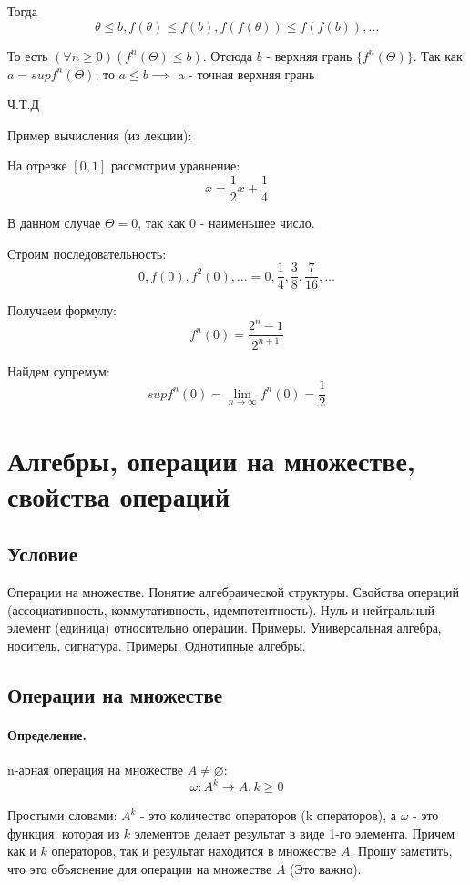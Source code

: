 \documentclass{report}
\begin{document}
\medskip

Тогда
\[
\theta \le b, f(\theta) \le  f(b), f(f(\theta)) \le  f(f(b)), \ldots
\] 


То есть $(\forall n \geq 0)(f^{n}(\Theta) \leq b)$. Отсюда $b$ - верхняя грань $\{f^{n}(\Theta)\}$.
Так как $a = supf^{n}(\Theta)$, то $a \leq b \implies$ a - точная верхняя грань

\medskip

Ч.Т.Д

\medskip

Пример вычисления (из лекции):

На отрезке $[0,1]$ рассмотрим уравнение: 
\[
x = \frac{1}{2}x + \frac{1}{4}
\]

В данном случае $\Theta = 0$, так как $0$ - наименьшее число.

Строим последовательность:
\[
0, f(0), f^{2}(0), \ldots = 0, \frac{1}{4}, \frac{3}{8}, \frac{7}{16}, \ldots
\] 

Получаем формулу:
\[
f^{n}(0) = \frac{2^{n} - 1}{2^{n+1}}
\] 

Найдем супремум:
\[
supf^{n}(0) = \lim_{n \to \infty} f^{n}(0) = \frac{1}{2}
\] 

\newpage

\section{Алгебры, операции на множестве, свойства операций}
\subsection{Условие}
Операции на множестве. Понятие алгебраической структуры. Свойства операций
(ассоциативность, коммутативность, идемпотентность). Нуль и нейтральный элемент
(единица) относительно операции. Примеры. Универсальная алгебра, носитель,
сигнатура. Примеры. Однотипные алгебры.

\subsection{Операции на множестве}

\paragraph*{Определение.} n-арная операция на множестве $A \neq \varnothing$: 
\[
\omega: A^{k} \to A, k\ge 0
\] 

\medskip

Простыми словами: $A^{k}$ - это количество операторов (k операторов),
а $\omega$ - это функция, которая из $k$ элементов делает результат в виде 1-го элемента.
Причем как и $k$ операторов, так и результат находится в множестве $A$. Прошу заметить,
что это объяснение для операции на множестве $A$ (Это важно).
\end{document}
